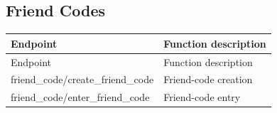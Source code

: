 \subsection{Friend Codes}

\begin{longtable}{>{\ttfamily}p{}p{}}
\toprule
Endpoint & Function description \\
\midrule
\endfirsthead%

\toprule
Endpoint & Function description \\
\midrule
\endhead%

friend\_code/create\_friend\_code
    & Friend-code creation \\

friend\_code/enter\_friend\_code
    & Friend-code entry \\

\bottomrule
\end{longtable}